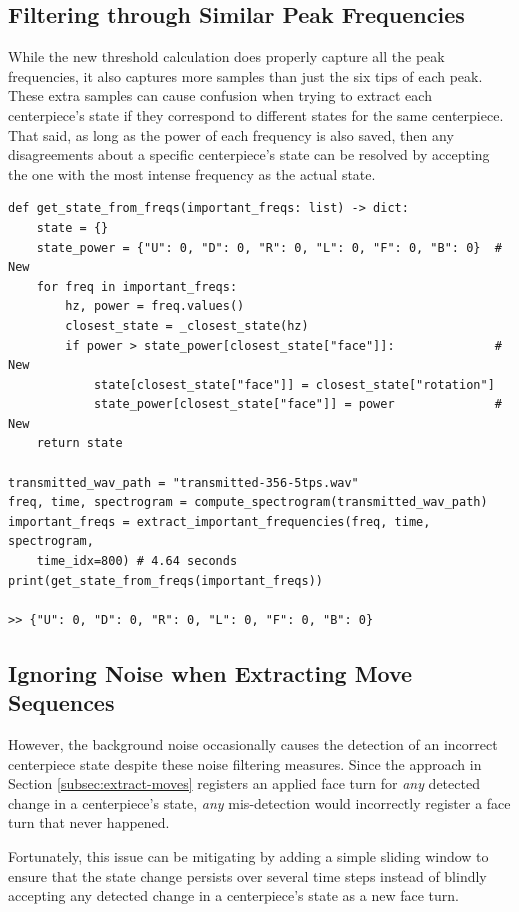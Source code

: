 \subsection{Filtering through Similar Peak Frequencies}
\label{subsec:filtering-similar-peak-frequencies}
While the new threshold calculation does properly capture all the peak frequencies, it also captures more samples than just the six tips of each peak. 
These extra samples can cause confusion when trying to extract each centerpiece's state if they correspond to different states for the same centerpiece.
That said, as long as the power of each frequency is also saved, then any disagreements about a specific centerpiece's state can be resolved by accepting the one with the most intense frequency as the actual state.

\begin{verbatim}
def get_state_from_freqs(important_freqs: list) -> dict:
    state = {}
    state_power = {"U": 0, "D": 0, "R": 0, "L": 0, "F": 0, "B": 0}  # New
    for freq in important_freqs:
        hz, power = freq.values()
        closest_state = _closest_state(hz)
        if power > state_power[closest_state["face"]]:              # New
            state[closest_state["face"]] = closest_state["rotation"]
            state_power[closest_state["face"]] = power              # New
    return state

transmitted_wav_path = "transmitted-356-5tps.wav"
freq, time, spectrogram = compute_spectrogram(transmitted_wav_path)
important_freqs = extract_important_frequencies(freq, time, spectrogram,
    time_idx=800) # 4.64 seconds
print(get_state_from_freqs(important_freqs))

>> {"U": 0, "D": 0, "R": 0, "L": 0, "F": 0, "B": 0}
\end{verbatim}

\newpage
\subsection{Ignoring Noise when Extracting Move Sequences}
\label{subsec:ignoring-noise-when-extracting-move-sequences}
However, the background noise occasionally causes the detection of an incorrect centerpiece state despite these noise filtering measures.
Since the approach in Section \ref{subsec:extract-moves} registers an applied face turn for \emph{any} detected change in a centerpiece's state, \emph{any} mis-detection would incorrectly register a face turn that never happened.

Fortunately, this issue can be mitigating by adding a simple sliding window to ensure that the state change persists over several time steps instead of blindly accepting any detected change in a centerpiece's state as a new face turn.

